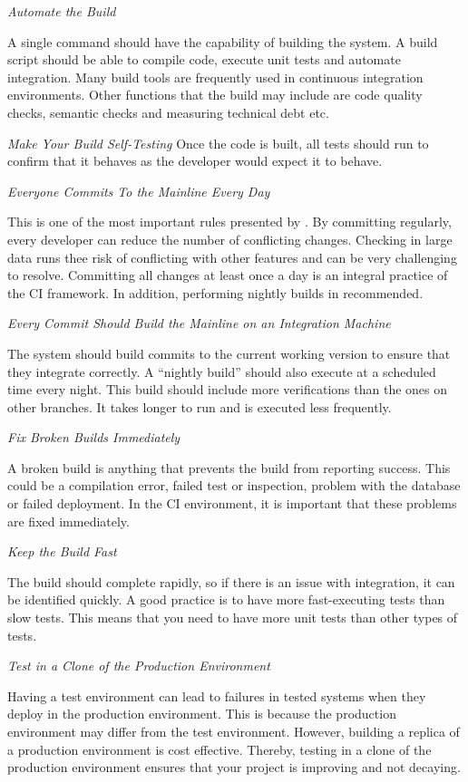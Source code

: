 \documentclass[]{book}
\begin{document}
\emph{Automate the Build}

A single command should have the capability of building the system. A
build script should be able to compile code, execute unit tests and
automate integration. Many build tools are frequently used in continuous
integration environments. Other functions that the build may include are
code quality checks, semantic checks and measuring technical debt etc.

\emph{Make Your Build Self-Testing} Once the code is built, all tests
should run to confirm that it behaves as the developer would expect it
to behave.

\emph{Everyone Commits To the Mainline Every Day}

This is one of the most important rules presented by
\citet{fowler2006continuous}. By committing regularly, every developer
can reduce the number of conflicting changes. Checking in large data
runs thee risk of conflicting with other features and can be very
challenging to resolve. Committing all changes at least once a day is an
integral practice of the CI framework. In addition, performing nightly
builds in recommended.

\emph{Every Commit Should Build the Mainline on an Integration Machine}

The system should build commits to the current working version to ensure
that they integrate correctly. A ``nightly build'' should also execute
at a scheduled time every night. This build should include more
verifications than the ones on other branches. It takes longer to run
and is executed less frequently.

\emph{Fix Broken Builds Immediately}

A broken build is anything that prevents the build from reporting
success. This could be a compilation error, failed test or inspection,
problem with the database or failed deployment. In the CI environment,
it is important that these problems are fixed immediately.

\emph{Keep the Build Fast}

The build should complete rapidly, so if there is an issue with
integration, it can be identified quickly. A good practice is to have
more fast-executing tests than slow tests. This means that you need to
have more unit tests than other types of tests.

\emph{Test in a Clone of the Production Environment}

Having a test environment can lead to failures in tested systems when
they deploy in the production environment. This is because the
production environment may differ from the test environment. However,
building a replica of a production environment is cost effective.
Thereby, testing in a clone of the production environment ensures that
your project is improving and not decaying.
\end{document}
